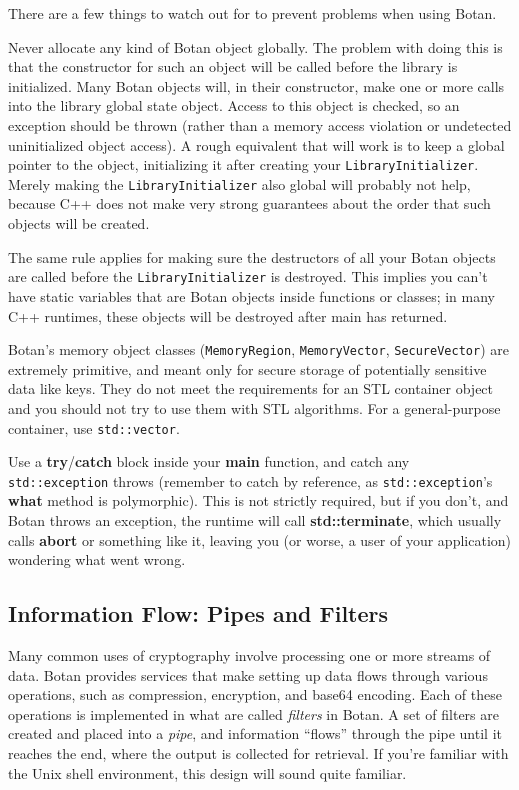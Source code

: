 \documentclass{article}
\newcommand{\function}[1]{\textbf{#1}}
\newcommand{\type}[1]{\texttt{#1}}
\begin{document}
There are a few things to watch out for to prevent problems when using Botan.

Never allocate any kind of Botan object globally. The problem with
doing this is that the constructor for such an object will be called
before the library is initialized. Many Botan objects will, in their
constructor, make one or more calls into the library global state
object. Access to this object is checked, so an exception should be
thrown (rather than a memory access violation or undetected
uninitialized object access). A rough equivalent that will work is to
keep a global pointer to the object, initializing it after creating
your \type{LibraryInitializer}. Merely making the
\type{LibraryInitializer} also global will probably not help, because
C++ does not make very strong guarantees about the order that such
objects will be created.

The same rule applies for making sure the destructors of all your
Botan objects are called before the \type{LibraryInitializer} is
destroyed. This implies you can't have static variables that are Botan
objects inside functions or classes; in many C++ runtimes, these
objects will be destroyed after main has returned.

Botan's memory object classes (\type{MemoryRegion},
\type{MemoryVector}, \type{SecureVector}) are extremely primitive, and
meant only for secure storage of potentially sensitive data like
keys. They do not meet the requirements for an STL container object
and you should not try to use them with STL algorithms. For a
general-purpose container, use \type{std::vector}.

Use a \function{try}/\function{catch} block inside your
\function{main} function, and catch any \type{std::exception} throws
(remember to catch by reference, as \type{std::exception}'s
\function{what} method is polymorphic). This is not strictly required,
but if you don't, and Botan throws an exception, the runtime will call
\function{std::terminate}, which usually calls \function{abort} or
something like it, leaving you (or worse, a user of your application)
wondering what went wrong.

\subsection{Information Flow: Pipes and Filters}

Many common uses of cryptography involve processing one or more
streams of data. Botan provides services that make setting up data
flows through various operations, such as compression, encryption, and
base64 encoding. Each of these operations is implemented in what are
called \emph{filters} in Botan. A set of filters are created and
placed into a \emph{pipe}, and information ``flows'' through the pipe
until it reaches the end, where the output is collected for
retrieval. If you're familiar with the Unix shell environment, this
design will sound quite familiar.
\end{document}
